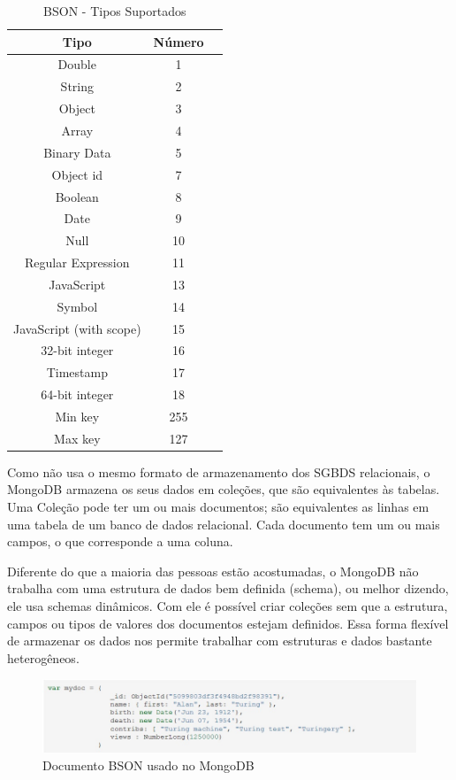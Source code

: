 \begin{table}
	\caption{BSON - Tipos Suportados}
	\begin{center}
	\begin{tabular}{ccc}
		\hline
			\textbf{Tipo} & \textbf{Número} \\
		\hline
			Double & 1 \\
			String & 2 \\
			Object & 3 \\
			Array & 4 \\
			Binary Data & 5 \\
			Object id & 7 \\
			Boolean & 8 \\
			Date & 9 \\
			Null & 10 \\
			Regular Expression & 11 \\
			JavaScript & 13 \\
			Symbol & 14 \\
			JavaScript (with scope) & 15 \\
			32-bit integer & 16 \\
			Timestamp& 17 \\
			64-bit integer & 18 \\
			Min key & 255 \\
			Max key & 127 \\
		\hline
	\end {tabular}
	\end{center}
	\label{tab:bsontypes}
\end{table}

Como não usa o mesmo formato de armazenamento dos SGBDS relacionais, o MongoDB armazena os seus dados em coleções, que são equivalentes às tabelas.  Uma Coleção pode ter um ou mais documentos; são equivalentes as linhas em uma tabela de um banco de dados relacional. Cada documento tem um ou mais campos, o que corresponde a uma coluna.

Diferente do que a maioria das pessoas estão acostumadas, o MongoDB não trabalha com uma estrutura de dados bem definida (schema), ou melhor dizendo, ele usa schemas dinâmicos. Com ele é possível criar coleções sem que a estrutura, campos ou tipos de valores dos documentos estejam definidos. Essa forma flexível de armazenar os dados nos permite trabalhar com estruturas e dados bastante heterogêneos.

	\begin{figure}[!htbp]
		\begin{center}
			\includegraphics[width=1.2\textwidth]{exbson}
		\end{center}
		\caption{Documento BSON usado no MongoDB}
		\label{fig:exbson}
	\end{figure}

